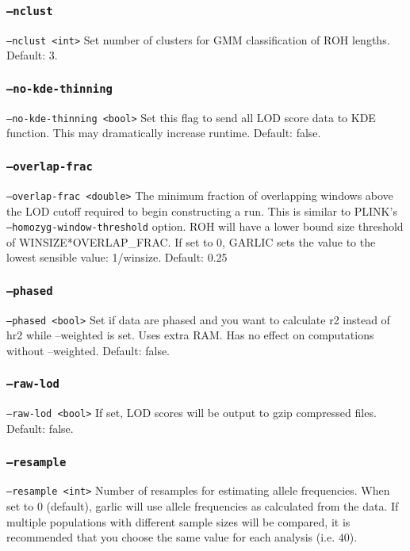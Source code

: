 \documentclass[12pt]{article}%
\begin{document}
\subsubsection{{\tt --nclust}}
{\tt --nclust <int>} Set number of clusters for GMM classification of ROH lengths. Default: 3.

\subsubsection{{\tt --no-kde-thinning}}
{\tt --no-kde-thinning <bool>} Set this flag to send all LOD score data to KDE function. This may dramatically increase runtime. Default: false.

\subsubsection{{\tt --overlap-frac}}
{\tt --overlap-frac <double>} The minimum fraction of overlapping windows above the LOD cutoff required to begin constructing a run. This is similar to PLINK's {\tt --homozyg-window-threshold} option. ROH will have a lower bound size threshold of WINSIZE*OVERLAP\_FRAC. If set to 0, GARLIC sets the value to the lowest sensible value: 1/winsize. Default: 0.25

\subsubsection{{\tt --phased}}
{\tt --phased <bool>} Set if data are phased and you want to calculate r2 instead of hr2 while --weighted is set.
Uses extra RAM. Has no effect on computations without --weighted. Default: false.

\subsubsection{{\tt --raw-lod}}
{\tt --raw-lod <bool>} If set, LOD scores will be output to gzip compressed files. Default: false.

\subsubsection{{\tt --resample}}
{\tt --resample <int>} Number of resamples for estimating allele frequencies. When set to $0$ (default), garlic will use allele frequencies as calculated from the data. If multiple populations with different sample sizes will be compared, it is recommended that you choose the same value for each analysis (i.e. $40$).
\end{document}
